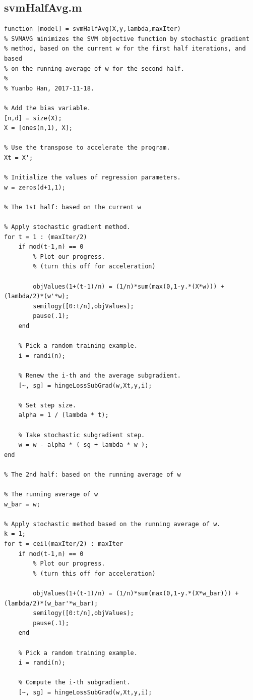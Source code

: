 \documentclass{article}
\begin{document}
\subsection{svmHalfAvg.m}
\begin{lstlisting}
function [model] = svmHalfAvg(X,y,lambda,maxIter)
% SVMAVG minimizes the SVM objective function by stochastic gradient
% method, based on the current w for the first half iterations, and based
% on the running average of w for the second half.
%
% Yuanbo Han, 2017-11-18.

% Add the bias variable.
[n,d] = size(X);
X = [ones(n,1), X];

% Use the transpose to accelerate the program.
Xt = X';

% Initialize the values of regression parameters.
w = zeros(d+1,1);

% The 1st half: based on the current w

% Apply stochastic gradient method.
for t = 1 : (maxIter/2)
    if mod(t-1,n) == 0
        % Plot our progress.
        % (turn this off for acceleration)
        
        objValues(1+(t-1)/n) = (1/n)*sum(max(0,1-y.*(X*w))) + (lambda/2)*(w'*w);
        semilogy([0:t/n],objValues);
        pause(.1);
    end
    
    % Pick a random training example.
    i = randi(n);
    
    % Renew the i-th and the average subgradient.
    [~, sg] = hingeLossSubGrad(w,Xt,y,i);
    
    % Set step size.
    alpha = 1 / (lambda * t);
    
    % Take stochastic subgradient step.
    w = w - alpha * ( sg + lambda * w );
end

% The 2nd half: based on the running average of w

% The running average of w
w_bar = w;

% Apply stochastic method based on the running average of w.
k = 1;
for t = ceil(maxIter/2) : maxIter
    if mod(t-1,n) == 0
        % Plot our progress.
        % (turn this off for acceleration)
        
        objValues(1+(t-1)/n) = (1/n)*sum(max(0,1-y.*(X*w_bar))) + (lambda/2)*(w_bar'*w_bar);
        semilogy([0:t/n],objValues);
        pause(.1);
    end
    
    % Pick a random training example.
    i = randi(n);
    
    % Compute the i-th subgradient.
    [~, sg] = hingeLossSubGrad(w,Xt,y,i);
    

\end{lstlisting}
\end{document}
